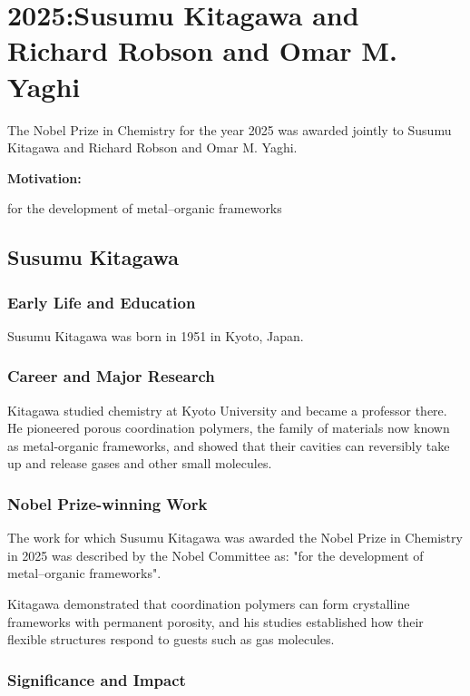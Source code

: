 \chapter{2025:Susumu Kitagawa and Richard Robson and Omar M. Yaghi}

\label{chap:chemistry2025}

The Nobel Prize in Chemistry for the year 2025 was awarded jointly to Susumu Kitagawa and Richard Robson and Omar M. Yaghi.

\textbf{Motivation:}

for the development of metal–organic frameworks

\section{Susumu Kitagawa}

\subsection*{Early Life and Education}

Susumu Kitagawa was born in 1951 in Kyoto, Japan.

\subsection*{Career and Major Research}

Kitagawa studied chemistry at Kyoto University and became a professor there. He pioneered porous coordination polymers, the family of materials now known as metal-organic frameworks, and showed that their cavities can reversibly take up and release gases and other small molecules.

\subsection*{Nobel Prize-winning Work}

The work for which Susumu Kitagawa was awarded the Nobel Prize in Chemistry in 2025 was described by the Nobel Committee as: "for the development of metal–organic frameworks".

Kitagawa demonstrated that coordination polymers can form crystalline frameworks with permanent porosity, and his studies established how their flexible structures respond to guests such as gas molecules.

\subsection*{Significance and Impact}

